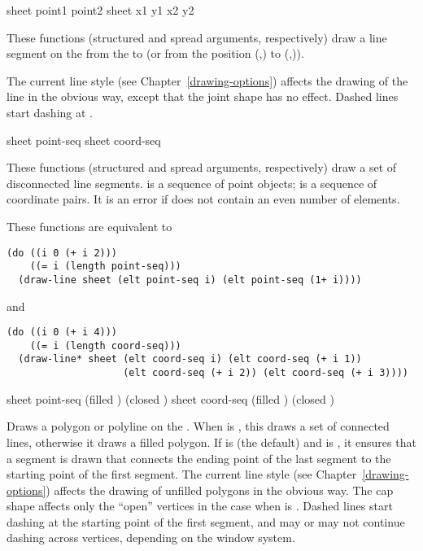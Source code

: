   {sheet point1 point2 \key \DrawingOptions \LineCapOptions}
 {sheet x1 y1  x2 y2  \key \DrawingOptions \LineCapOptions}

These functions (structured and spread arguments, respectively) draw a line
segment on the   from the   to
 (or from the position (,) to (,)).

The current line style (see Chapter~\ref{drawing-options}) affects the drawing
of the line in the obvious way, except that the joint shape has no effect.
Dashed lines start dashing at .


  {sheet point-seq \key \DrawingOptions \LineCapOptions}
 {sheet coord-seq \key \DrawingOptions \LineCapOptions}

These functions (structured and spread arguments, respectively) draw a set of
disconnected line segments.   is a sequence of point objects;
 is a sequence of coordinate pairs.  It is an error if
 does not contain an even number of elements.

These functions are equivalent to
\begin{verbatim}
(do ((i 0 (+ i 2)))
    ((= i (length point-seq)))
  (draw-line sheet (elt point-seq i) (elt point-seq (1+ i))))
\end{verbatim}
and
\begin{verbatim}
(do ((i 0 (+ i 4)))
    ((= i (length coord-seq)))
  (draw-line* sheet (elt coord-seq i) (elt coord-seq (+ i 1))
                    (elt coord-seq (+ i 2)) (elt coord-seq (+ i 3))))
\end{verbatim}


  {sheet point-seq \key (filled ) (closed )
                        \DrawingOptions  \LineJointCapOptions}
 {sheet coord-seq \key (filled ) (closed ) 
                        \DrawingOptions \LineJointCapOptions}

Draws a polygon or polyline on the  .  When
 is , this draws a set of connected lines, otherwise it
draws a filled polygon.  If  is  (the default) and
 is , it ensures that a segment is drawn that connects
the ending point of the last segment to the starting point of the first segment.
The current line style (see Chapter~\ref{drawing-options}) affects the drawing
of unfilled polygons in the obvious way.  The cap shape affects only the
``open'' vertices in the case when  is .  Dashed lines
start dashing at the starting point of the first segment, and may or may not
continue dashing across vertices, depending on the window system.

